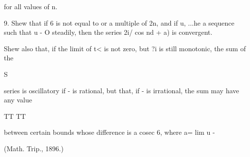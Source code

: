 for all values of n.

9. Shew that if 6 is not equal to or a multiple of 2n, and if %
u, ...he a sequence such that u - O steadily, then the series 2i/ cos
nd + a) is convergent.

Shew also that, if the limit of t< is not zero, but ?i is still
monotonic, the sum of the

S

series is oscillatory if - is rational, but that, if - is irrational,
the sum may have any value

TT TT

between certain bounds whose difference is a cosec 6, where a= lim u -

(Math. Trip., 1896.)

